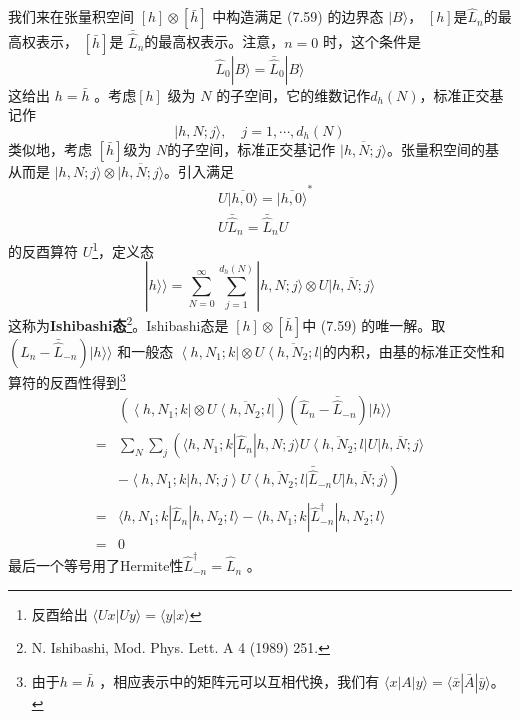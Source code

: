 我们来在张量积空间 $[h] \otimes[\bar{h}]$ 中构造满足 (7.59) 的边界态 $|B\rangle $， $[h] $是$ \hat{L}_{n} $的最高权表示， $[\bar{h}] $是 $\bar{\hat{L}}_{n} $的最高权表示。注意，$ n=0$ 时，这个条件是
$$
\hat{L}_{0}|B\rangle=\bar{\hat{L}}_{0}|B\rangle
$$
这给出 $h=\bar{h}$ 。考虑$ [h]$ 级为 $N$ 的子空间，它的维数记作$d_{h}(N) $，标准正交基记作
$$
|h, N ; j\rangle, \quad j=1, \cdots, d_{h}(N)
$$
类似地，考虑 $[\bar{h}] $级为 $N $的子空间，标准正交基记作 $\overline{|h, N ; j\rangle} $。张量积空间的基从而是 $|h, N ; j\rangle\otimes\overline{|h, N ; j\rangle} $。引入满足
\begin{align} &U \overline{|h, 0\rangle}=\overline{|h, 0\rangle}^{*} \\ &U \bar{\hat{L}}_{n}=\bar{\hat{L}}_{n} U \end{align}
的反酉算符 $U $\footnote{反酉给出 $\langle Ux|Uy\rangle=\langle y|x\rangle$ }，定义态
\begin{equation}
	|h\rangle\rangle=\sum_{N=0}^{\infty} \sum_{j=1}^{d_{h}(N)}|h, N ; j\rangle \otimes U \overline{|h, N ; j\rangle}
\end{equation}
这称为\textbf{Ishibashi态}\footnote{N. Ishibashi, Mod. Phys. Lett. A 4 (1989) 251.}。Ishibashi态是 $[h] \otimes[\bar{h}] $中 (7.59) 的唯一解。取 $\left(\hat{L}_{n}-\bar{\hat{L}}_{-n}\right)|h\rangle \rangle$ 和一般态 $\left\langle h, N_{1} ; k\right| \otimes U \overline{\left\langle h, N_{2} ; l\right|} $的内积，由基的标准正交性和算符的反酉性得到\footnote{由于$ h=\bar{h}$ ，相应表示中的矩阵元可以互相代换，我们有 $\langle x|A|y\rangle=\langle \bar{x}|\bar{A}|\bar{y}\rangle $。}
\begin{equation}
	\begin{aligned} & \left(\left\langle h, N_{1} ; k\right| \otimes U \overline{\left\langle h, N_{2} ; l\right|}\right)\left(\hat{L}_{n}-\bar{\hat{L}}_{-n}\right)|h\rangle \rangle \\ =& \sum_{N} \sum_{j}\left( \langle h, N_{1} ; k |\hat{L}_{n} | h, N ; j \rangle U \overline{\left\langle h, N_{2} ; l\right|} U \overline{|h, N ; j\rangle}\right.\\&\left.-\left\langle h, N_{1} ; k | h, N ; j\right\rangle U \overline{\left\langle h, N_{2} ; l\right|} \bar{\hat{L}}_{-n} U \overline{|h, N ; j\rangle}\right) \\ =& \langle h, N_{1} ; k |\hat{L}_{n} | h, N_{2} ; l \rangle- \langle h, N_{1} ;k |\hat{L}_{-n}^\dagger | h, N_{2} ; l \rangle \\ =& 0 \end{aligned}
\end{equation}
最后一个等号用了Hermite性$ \hat{L}_{-n}^{\dagger}=\hat{L}_{n}$ 。

